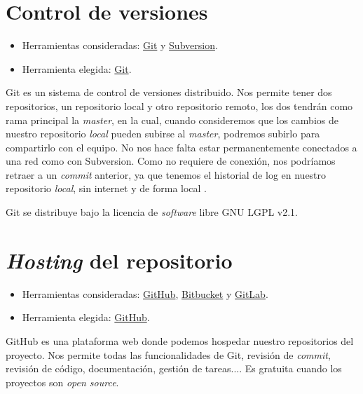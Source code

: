 
\newpage\section{Control de versiones}\label{control-de-versiones}

\begin{itemize}
	\tightlist
	\item
	Herramientas consideradas: \href{https://git-scm.com/}{Git} y
	\href{https://subversion.apache.org/}{Subversion}.
	\item
	Herramienta elegida: \href{https://git-scm.com/}{Git}.
\end{itemize}

Git es un sistema de control de versiones distribuido. Nos permite tener dos repositorios, un repositorio local y otro repositorio remoto, los dos tendrán como rama principal la \emph{master}, en la cual, cuando consideremos que los cambios de nuestro repositorio \emph{local} pueden subirse al \emph{master}, podremos subirlo para compartirlo con el equipo.  No nos hace falta estar permanentemente conectados a una red como con Subversion. Como no requiere de conexión, nos podríamos retraer a un \emph{commit} anterior, ya que tenemos el historial de log en nuestro repositorio \emph{local}, sin internet y de forma local \cite{web:git}.

Git se distribuye bajo la licencia de \emph{software} libre GNU LGPL v2.1.

\section{\emph{Hosting} del repositorio}\label{hosting-del-repositorio}

\begin{itemize}
	\tightlist
	\item
	Herramientas consideradas: \href{https://github.com/}{GitHub},
	\href{https://bitbucket.org/}{Bitbucket} y
	\href{https://gitlab.com/}{GitLab}.
	\item
	Herramienta elegida: \href{https://github.com/}{GitHub}.
\end{itemize}

GitHub es una plataforma web donde podemos hospedar nuestro repositorios del proyecto. Nos permite todas las  funcionalidades de Git, revisión de \emph{commit}, revisión de código, documentación, gestión de tareas.... Es
gratuita cuando los proyectos son \emph{open source}.

